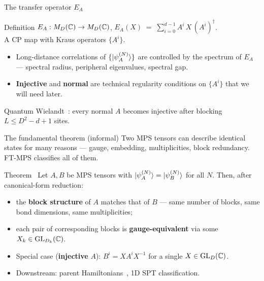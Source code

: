 \documentclass[aspectratio=169,10pt]{beamer}
\begin{document}
\begin{frame}{The transfer operator $E_A$}
    \begin{block}{Definition}
        $E_A : M_D(\mathbb{C}) \to M_D(\mathbb{C})$, \quad $E_A(X) \;=\; \sum_{i=0}^{d-1} A^i\, X\, (A^i)^\dagger$.
        \\[2pt]
        A CP map with Kraus operators $\{A^i\}$.
    \end{block}
    \vspace{0.5em}
    \begin{itemize}
        \item Long-distance correlations of $\{\ket{\psi_A^{(N)}}\}$ are controlled by the spectrum of $E_A$ --- spectral radius, peripheral eigenvalues, spectral gap.
        \item \textbf{Injective} and \textbf{normal} are technical regularity conditions on $\{A^i\}$ that we will need later.
    \end{itemize}
    \vspace{0.6em}
    \textcolor{dimwhite}{\footnotesize Quantum Wielandt~\cite{Sanz2010Quantum}: every normal $A$ becomes injective after blocking $L \leq D^2 - d + 1$ sites.}
\end{frame}

\begin{frame}{The fundamental theorem (informal)}
    Two MPS tensors can describe identical states for many reasons --- gauge, embedding, multiplicities, block redundancy. FT-MPS classifies all of them.
    \vspace{0.4em}
    \begin{block}{Theorem~\cite{Perez-Garcia2007Matrix,Cirac2017Annals,Cirac2017Irreducible}}
        Let $A, B$ be MPS tensors with $\ket{\psi_A^{(N)}} = \ket{\psi_B^{(N)}}$ for all $N$. Then, after canonical-form reduction:
        \begin{itemize}
            \item the \textbf{block structure} of $A$ matches that of $B$ --- same number of blocks, same bond dimensions, same multiplicities;
            \item each pair of corresponding blocks is \textbf{gauge-equivalent} via some $X_k \in \mathrm{GL}_{D_k}(\mathbb{C})$.
        \end{itemize}
    \end{block}
    \vspace{0.3em}
    \begin{itemize}
        \item Special case (\textbf{injective} $A$): $B^i = X A^i X^{-1}$ for a single $X \in \mathrm{GL}_D(\mathbb{C})$.
        \item Downstream: parent Hamiltonians~\cite{Fannes1992Finitely}, 1D SPT classification.
    \end{itemize}
\end{frame}
\end{document}
